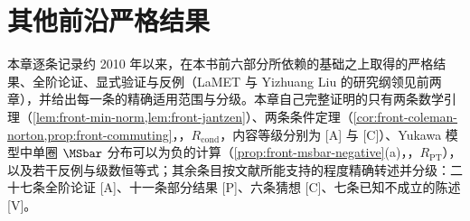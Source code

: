 \chapter{其他前沿严格结果}\label{ch:front}

本章逐条记录约 2010 年以来，在本书前六部分所依赖的基础之上取得的严格结果、全阶论证、显式验证与反例（LaMET 与 Yizhuang Liu 的研究纲领见前两章），并给出每一条的精确适用范围与分级。本章自己完整证明的只有两条数学引理（\cref{lem:front-min-norm,lem:front-jantzen}）、两条条件定理（\cref{cor:front-coleman-norton,prop:front-commuting}，\tagR，$R_{\mathrm{cond}}$，内容等级分别为 [A] 与 [C]）、Yukawa 模型中单圈 $\MSbar$ 分布可以为负的计算（\cref{prop:front-msbar-negative}(a)，\tagR，$R_{\mathrm{PT}}$），以及若干反例与级数恒等式；其余条目按文献所能支持的程度精确转述并分级：二十七条全阶论证 [A]、十一条部分结果 [P]、六条猜想 [C]、七条已知不成立的陈述 [V]。

